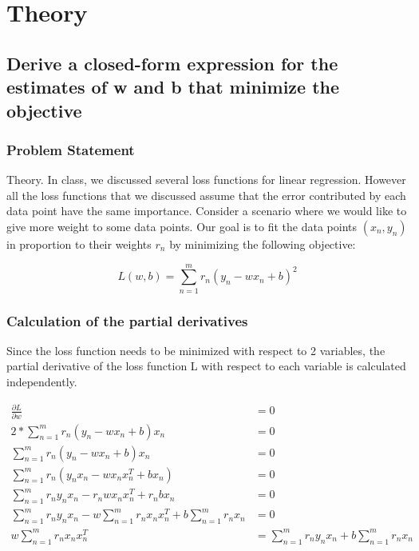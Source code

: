 \documentclass[a4paper]{article}
\begin{document}
\newpage

\section{Theory}

\subsection{Derive a closed-form expression for the estimates of w and b that minimize the objective}

\subsubsection{Problem Statement}

Theory. In class, we discussed several loss functions for linear regression. However all the loss functions that we discussed assume that the error contributed by each data point have the same importance. Consider a scenario where we would like to give more weight to some data points. Our goal is to fit the data points $(x_n , y_n )$ in proportion to their weights $r_n$ by minimizing the following objective:

$$L(w, b) = \sum_{n=1}^m r_n (y_n - wx_n + b)^2$$


\subsubsection{Calculation of the partial derivatives}

Since the loss function needs to be minimized with respect to 2 variables, the partial derivative of the loss function L with respect to each variable is calculated independently.

\begin{align*}
	\frac{\partial L}{\partial w} &= 0\\
	2 * \sum_{n=1}^m r_n (y_n - wx_n + b) x_n &= 0\\
	\sum_{n=1}^m r_n (y_n - wx_n + b) x_n &= 0\\
	\sum_{n=1}^m r_n (y_n x_n - wx_nx_n^T + bx_n) &= 0\\
	\sum_{n=1}^m r_n y_n x_n - r_n w x_n x_n^T + r_n b x_n &= 0\\
	\sum_{n=1}^m r_n y_n x_n - w \sum_{n=1}^m r_n x_n x_n^T + b \sum_{n=1}^m r_n x_n &= 0\\
	w \sum_{n=1}^m r_n x_n x_n^T &=  \sum_{n=1}^m r_n y_n x_n + b \sum_{n=1}^m r_n x_n
\end{align*}
\end{document}
